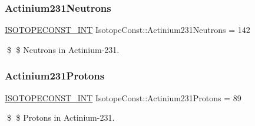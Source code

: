 \subsubsection{\texorpdfstring{Actinium231\+Neutrons}{Actinium231Neutrons}}
{\footnotesize\ttfamily \mbox{\hyperlink{group___isotope_const-_macros_ga5f18360b3e99483a35c32d789e62621c}{I\+S\+O\+T\+O\+P\+E\+C\+O\+N\+S\+T\+\_\+\+I\+NT}} Isotope\+Const\+::\+Actinium231\+Neutrons = 142}

\$ \$ Neutrons in Actinium-\/231. \mbox{\label{group___isotope_const-_actinium-_ac231_ga4273e97bcb0aef662b922791721165eb}} 
\subsubsection{\texorpdfstring{Actinium231\+Protons}{Actinium231Protons}}
{\footnotesize\ttfamily \mbox{\hyperlink{group___isotope_const-_macros_ga5f18360b3e99483a35c32d789e62621c}{I\+S\+O\+T\+O\+P\+E\+C\+O\+N\+S\+T\+\_\+\+I\+NT}} Isotope\+Const\+::\+Actinium231\+Protons = 89}

\$ \$ Protons in Actinium-\/231. 